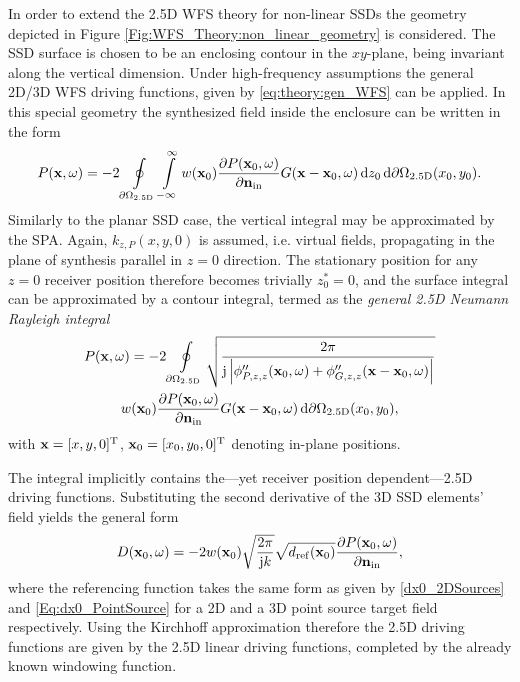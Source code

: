 In order to extend the 2.5D WFS theory for non-linear SSDs the geometry depicted in Figure \ref{Fig:WFS_Theory:non_linear_geometry} is considered. The SSD surface is chosen to be an enclosing contour in the $xy$-plane, being invariant along the vertical dimension.
Under high-frequency assumptions the general 2D/3D WFS driving functions, given by \eqref{eq:theory:gen_WFS} can be applied. In this special geometry the synthesized field inside the enclosure can be written in the form
\begin{equation}
P(\mathbf{x},\omega) = -2 \oint\displaylimits_{\partial \Omega_{2.5\mathrm{D}}} \int\displaylimits_{-\infty}^{\infty} w(\mathbf{x}_0) \frac{\partial P(\mathbf{x}_0,\omega)}{\partial \mathbf{n}_{\mathrm{in}}} G(\mathbf{x}-\mathbf{x}_0,\omega) \, \mathrm{d} z_0 \, \mathrm{d} \partial \Omega_{2.5\mathrm{D}}(x_0,y_0).
\end{equation}
Similarly to the planar SSD case, the vertical integral may be approximated by the SPA. Again, $k_{z,P}(x,y,0)$ is assumed, i.e. virtual fields, propagating in the plane of synthesis parallel in $z=0$ direction. The stationary position for any $z=0$ receiver position therefore becomes trivially $z_0^*=0$, and the surface integral can be approximated by a contour integral, termed as the \emph{general 2.5D Neumann Rayleigh integral}
\begin{multline}
P(\mathbf{x},\omega) = -2 \oint\displaylimits_{\partial \Omega_{2.5\mathrm{D}}} \sqrt{\frac{2 \pi}{\mathrm{j} \left| \phi''_{P,z,z}(\mathbf{x}_0,\omega) +  \phi''_{G,z,z}(\mathbf{x} - \mathbf{x}_0,\omega) \right|}} \\
w(\mathbf{x}_0) \frac{\partial P(\mathbf{x}_0,\omega)}{\partial \mathbf{n}_{\mathrm{in}}} G(\mathbf{x}-\mathbf{x}_0,\omega) \, \mathrm{d} \partial \Omega_{2.5\mathrm{D}}(x_0,y_0),
\end{multline}
with $\mathbf{x} = [x,y,0]^{\mathrm{T}}$, $\mathbf{x}_0 = [x_0,y_0, 0]^{\mathrm{T}}$ denoting in-plane positions.

The integral implicitly contains the---yet receiver position dependent---2.5D driving functions. Substituting the second derivative of the 3D SSD elements' field yields the general form 
\begin{equation}
D(\mathbf{x}_0,\omega) = -2 w(\mathbf{x}_0) \sqrt{\frac{2 \pi}{\mathrm{j} k}}\sqrt{d_{\mathrm{ref}}(\mathbf{x}_0)}
\frac{\partial P(\mathbf{x}_0,\omega)}{\partial \mathbf{n}_{\mathrm{in}}},
\end{equation}
where the referencing function takes the same form as given by \eqref{dx0_2DSources} and \eqref{Eq:dx0_PointSource} for a 2D and a 3D point source target field respectively. Using the Kirchhoff approximation therefore the 2.5D driving functions are given by the 2.5D linear driving functions, completed by the already known windowing function.

